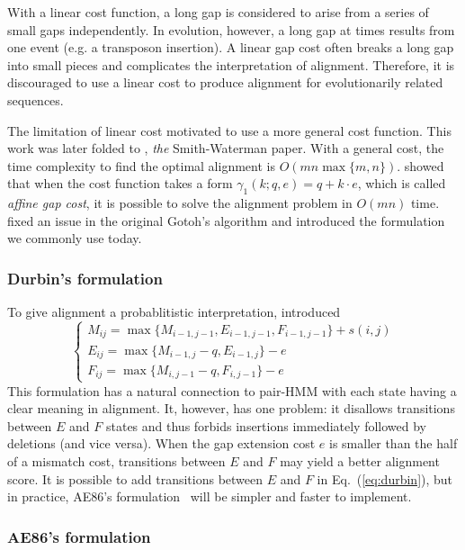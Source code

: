 \documentclass{bioinfo}
\begin{document}
\begin{methods}
With a linear cost function, a long gap is considered to arise from a series of
small gaps independently. In evolution, however, a long gap at times results
from one event (e.g. a transposon insertion). A linear gap cost often breaks a
long gap into small pieces and complicates the interpretation of alignment.
Therefore, it is discouraged to use a linear cost to produce alignment for
evolutionarily related sequences.

The limitation of linear cost motivated \citet{Waterman:1976aa} to use a more
general cost function. This work was later folded to \citet{Smith:1981aa},
\emph{the} Smith-Waterman paper. With a general cost, the time complexity to
find the optimal alignment is $O(mn\max\{m,n\})$. \citet{Gotoh:1982aa} showed
that when the cost function takes a form $\gamma_1(k;q,e)=q+k\cdot e$, which is
called \emph{affine gap cost}, it is possible to solve the alignment problem in
$O(mn)$ time. \citet{Altschul:1986aa} fixed an issue in the original Gotoh's
algorithm and introduced the formulation we commonly use today.

\subsubsection{Durbin's formulation}

To give alignment a probablitistic interpretation, \citet{Durbin:1998uq} 
introduced
\begin{equation}\label{eq:durbin}
\left\{\begin{array}{l}
M_{ij}=\max\{M_{i-1,j-1}, E_{i-1,j-1}, F_{i-1,j-1}\} + s(i,j)\\
E_{ij}=\max\{M_{i-1,j}-q, E_{i-1,j}\} - e\\
F_{ij}=\max\{M_{i,j-1}-q, F_{i,j-1}\} - e
\end{array}\right.
\end{equation}
This formulation has a natural connection to pair-HMM with each state having a
clear meaning in alignment. It, however, has one problem: it disallows
transitions between $E$ and $F$ states and thus forbids insertions immediately
followed by deletions (and vice versa). When the gap extension cost $e$ is
smaller than the half of a mismatch cost, transitions between $E$ and $F$ may
yield a better alignment score. It is possible to add transitions between $E$
and $F$ in Eq.~(\ref{eq:durbin}), but in practice, AE86's
formulation~\citep{Altschul:1986aa} will be simpler and faster to implement.

\subsubsection{AE86's formulation}


\end{methods}
\end{document}
